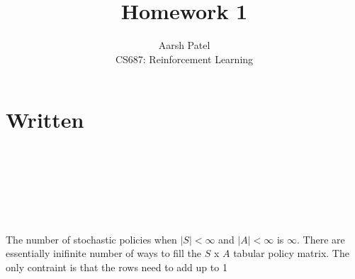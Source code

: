\documentclass[12pt]{article}
\newenvironment{problem}[2][Problem]{\begin{trivlist}
\item[\hskip \labelsep {\bfseries #1}\hskip \labelsep {\bfseries #2.}]}{\end{trivlist}}
\begin{document}
\title{Homework 1}
\author{Aarsh Patel\\
CS687: Reinforcement Learning}

\maketitle

\section*{Written}

\begin{problem}{1}
\\
\end{problem}

\begin{problem}{2}
\text{ }\\
\end{problem}

\begin{problem}{3}
\text{ }\\
\end{problem}

\begin{problem}{4}
\text{ }\\
The number of stochastic policies when $|S| < \infty$ and $|A| < \infty$ is $\infty$. There are essentially
inifinite number of ways to fill the $S$ x $A$ tabular policy matrix. The only contraint is that the rows
need to add up to 1
\end{problem}

\begin{problem}{5}
\text{ }\\
\end{problem}

\begin{problem}{6}
\text{ }\\
\end{problem}

\begin{problem}{7}
\text{ }\\
\end{problem}

\begin{problem}{8}
\text{ }\\
\end{problem}

\begin{problem}{9}
\text{ }\\
\end{problem}
\end{document}
